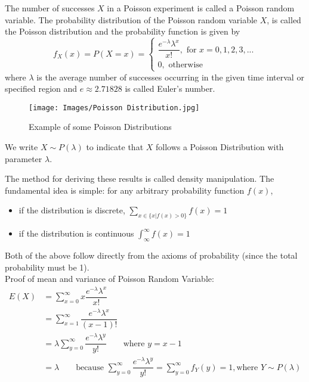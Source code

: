 \begin{definition}
The number of successes $X$ in a Poisson experiment is called a Poisson random variable. The probability distribution of the Poisson random variable $X$, is called the Poisson distribution and the probability function is given by 
$$
f_X(x) = P(X = x) = 
\begin{cases}
\dfrac{e^{-\lambda}\lambda^x}{x!}, \text{ for }x = 0,1,2,3,... \\
0, \text{ otherwise}
\end{cases}
$$
where $\lambda$ is the average number of successes occurring in the given time interval or specified region and $e \approx 2.71828$ is called Euler's number.
\end{definition}
\begin{figure}[ht]
    \centering
    \texttt{[image: Images/Poisson Distribution.jpg]}
    \caption{Example of some Poisson Distributions}
    \label{fig:my_label}
\end{figure}
We write $X \sim P(\lambda)$ to indicate that $X$ follows a Poisson Distribution with parameter $\lambda$.
\begin{note}
\end{note}
The method for deriving these results is called density manipulation. The fundamental idea is simple: for any arbitrary probability function $f(x)$,
\begin{itemize}
    \item if the distribution is discrete, $\sum_{x \in \{x|f(x)>0\}} f(x) = 1$
    \item if the distribution is continuous $\int_{\infty}^{\infty} f(x) = 1$
\end{itemize}
Both of the above follow directly from the axioms of probability (since the total probability must be 1). \\
Proof of mean and variance of Poisson Random Variable:
\begin{equation*}
    \begin{split}
        E(X) &= \sum_{x = 0}^{\infty} x \dfrac{e^{-\lambda}\lambda^x}{x!} \\
        &= \sum_{x = 1}^{\infty} \dfrac{e^{-\lambda}\lambda^x}{(x-1)!} \\
        &= \lambda \sum_{y = 0}^{\infty} \dfrac{e^{-\lambda}\lambda^y}{y!} \qquad \text{where } y = x - 1 \\
        &= \lambda \qquad \text{because } \sum_{y = 0}^{\infty}\dfrac{e^{-\lambda}\lambda^y}{y!} = \sum_{y = 0}^{\infty} f_Y(y) = 1, \text{where } Y \sim P(\lambda) 
    \end{split}
\end{equation*}

